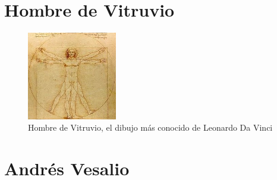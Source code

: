 \section{Hombre de Vitruvio} \label{app:vitruvio}

\begin{figure}[H]
    \centering
    \includegraphics[width=0.35\textwidth]{vitruvio2.jpg}
    \caption{Hombre de Vitruvio, el dibujo más conocido de Leonardo Da Vinci} %
\end{figure}

\section{Andrés Vesalio} \label{app:vesalio}

